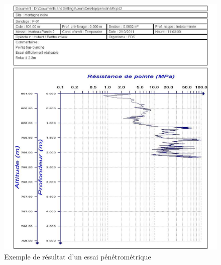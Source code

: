 \begin{figure}
    \centering
    \includegraphics[width=1\textwidth]{images/Contexte/penetrographe.png}
    \caption{Exemple de résultat d'un essai pénétrométrique}
    \label{fig:test_penetrometrique}
\end{figure}

